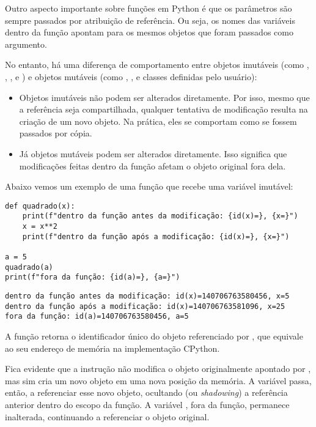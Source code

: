 Outro aspecto importante sobre funções em Python é que os parâmetros são sempre passados por atribuição de referência.
Ou seja, os nomes das variáveis dentro da função apontam para os mesmos objetos que foram passados como argumento.

No entanto, há uma diferença de comportamento entre objetos imutáveis
(como , , ,  e ) e objetos mutáveis
(como , ,  e classes definidas pelo usuário):


\begin{itemize}
\item Objetos imutáveis não podem ser alterados diretamente.
Por isso, mesmo que a referência seja compartilhada, qualquer tentativa de modificação resulta na criação de um novo objeto.
Na prática, eles se comportam como se fossem passados por cópia.

\item Já objetos mutáveis podem ser alterados diretamente.
Isso significa que modificações feitas dentro da função afetam o objeto original fora dela.

\end{itemize}

Abaixo vemos um exemplo de uma função que recebe uma variável imutável:
\begin{verbatim}
def quadrado(x):
    print(f"dentro da função antes da modificação: {id(x)=}, {x=}")
    x = x**2
    print(f"dentro da função após a modificação: {id(x)=}, {x=}")

a = 5
quadrado(a)
print(f"fora da função: {id(a)=}, {a=}")
\end{verbatim}
\begin{verbatim}
dentro da função antes da modificação: id(x)=140706763580456, x=5
dentro da função após a modificação: id(x)=140706763581096, x=25
fora da função: id(a)=140706763580456, a=5
\end{verbatim}

A função  retorna o identificador único do objeto referenciado por , que equivale
ao seu endereço de memória na implementação CPython.

Fica evidente que a instrução  não modifica o objeto originalmente apontado por , mas sim
cria um novo objeto em uma nova posição da memória. A variável  passa, então, a referenciar esse novo objeto,
ocultando (ou \emph{shadowing}) a referência anterior dentro do escopo da função. A variável , fora da função,
permanece inalterada, continuando a referenciar o objeto original.

